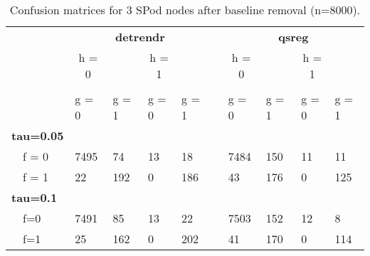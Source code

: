 \begin{table}[!tbp]
\caption{Confusion matrices for 3 SPod nodes after baseline removal (n=8000).\label{conf}} 
\begin{center}
\begin{tabular}{lllllcllll}
\hline\hline
\multicolumn{1}{l}{\bfseries }&\multicolumn{4}{c}{\bfseries detrendr}&\multicolumn{1}{c}{\bfseries }&\multicolumn{4}{c}{\bfseries qsreg}\tabularnewline
\cline{2-5} \cline{7-10}
\multicolumn{1}{l}{}&\multicolumn{1}{c}{h = 0}&\multicolumn{1}{c}{}&\multicolumn{1}{c}{h = 1}&\multicolumn{1}{c}{}&\multicolumn{1}{c}{}&\multicolumn{1}{c}{h = 0}&\multicolumn{1}{c}{}&\multicolumn{1}{c}{h = 1}&\multicolumn{1}{c}{}\tabularnewline
\hline
{\bfseries }&&&&&&&&&\tabularnewline
~~&g = 0&g = 1&g = 0&g = 1&&g = 0&g = 1&g = 0&g = 1\tabularnewline
\hline
{\bfseries tau=0.05}&&&&&&&&&\tabularnewline
~~f = 0&7495&74&13&18&&7484&150&11&11\tabularnewline
~~f = 1&22&192&0&186&&43&176&0&125\tabularnewline
\hline
{\bfseries tau=0.1}&&&&&&&&&\tabularnewline
~~f=0&7491&85&13&22&&7503&152&12&8\tabularnewline
~~f=1&25&162&0&202&&41&170&0&114\tabularnewline
\hline
\end{tabular}\end{center}
\end{table}
